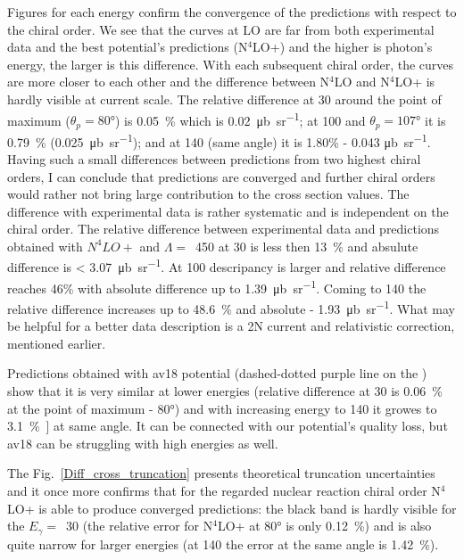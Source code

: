     Figures for each energy confirm the convergence 
    of the predictions with respect to the chiral order.
    We see that the curves at LO are far from both experimental 
    data and the best potential's predictions (N$^4$LO+) and
    the higher is photon's energy, the larger is this
    difference. With each subsequent chiral order, the 
    curves are more closer to each other and the difference
    between N$^4$LO and N$^4$LO+ is hardly visible at current scale.
    The relative difference at \SI{30}{\mev} around the point of maximum 
    ($\theta_p = \ang{80}$) is \SI{0.05}{\percent} which is \SI{0.02}{\micro \barn \per \steradian};
    at \SI{100}{\mev} and $\theta_p = \ang{107}$ it is \SI{0.79}{\percent} (\SI{0.025}{\micro \barn \per \steradian});
    and at \SI{140}{\mev} (same angle) it is 1.80\% - 0.043 \unit{\micro \barn \per \steradian}.
    Having such a small differences between predictions from two highest chiral orders,
    I can conclude that predictions are converged and 
    further chiral orders would rather not bring large contribution 
    to the cross section values. 
    The difference with experimental data is rather systematic 
    and is independent on the chiral order. 
    The relative difference between experimental data and predictions obtained with $N^4LO+$ and $\Lambda=$~\SI{450}{\mev} at \SI{30}{\mev} is less then \SI{13}{\percent}
    and absulute difference is < \SI{3.07}{\micro \barn \per \steradian}.
    At \SI{100}{\mev} descripancy is larger and relative difference reaches 46\% with absolute difference up to \SI{1.39}{\micro \barn \per \steradian}.
    Coming to \SI{140}{\mev} the relative difference 
    increases up to \SI{48.6}{\percent} and absolute - \SI{1.93}{\micro \barn \per \steradian}.
    What may be helpful
    for a better data description is a 2N current 
    and relativistic correction, mentioned earlier.

    Predictions obtained with \gls*{av18} potential (dashed-dotted purple line on the ) show that
    it is very similar at lower energies (relative difference at \SI{30}{\mev} is \SI{0.06}{\percent}
    at the point of maximum - \ang{80}) and with increasing energy to \SI{140}{\mev}
    it growes to \SI{3.1}{\percent]} at same angle. 
    It can be connected with our potential's quality loss, but \gls*{av18} can
    be struggling with high energies as well.

    The Fig.~\ref{Diff_cross_truncation} 
    presents theoretical truncation uncertainties and it once more
    confirms that for the regarded nuclear reaction chiral order
    N$^4$LO+ is able to produce converged predictions: 
    the black band is hardly visible for the $E_\gamma=$~\SI{30}{\mev}
    (the relative error for N$^4$LO+ at \ang{80} is only \SI{0.12}{\percent})
    and is also quite narrow for larger energies (at \SI{140}{\mev} 
    the error at the same angle is \SI{1.42}{\percent}). 

